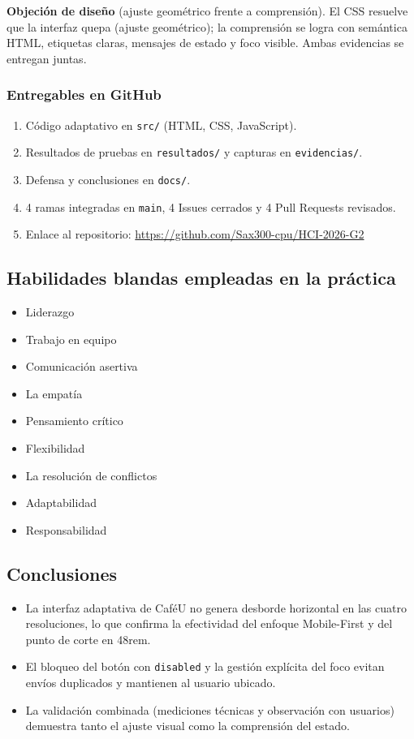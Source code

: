 \documentclass{article}
\begin{document}
\textbf{Objeción de diseño} (ajuste geométrico frente a comprensión). El CSS resuelve que la interfaz quepa (ajuste geométrico); la comprensión se logra con semántica HTML, etiquetas claras, mensajes de estado y foco visible. Ambas evidencias se entregan juntas.

\subsubsection{Entregables en GitHub}
\begin{enumerate}
    \item Código adaptativo en \texttt{src/} (HTML, CSS, JavaScript).
    \item Resultados de pruebas en \texttt{resultados/} y capturas en \texttt{evidencias/}.
    \item Defensa y conclusiones en \texttt{docs/}.
    \item 4 ramas integradas en \texttt{main}, 4 Issues cerrados y 4 Pull Requests revisados.
    \item Enlace al repositorio: \url{https://github.com/Sax300-cpu/HCI-2026-G2}
\end{enumerate}

\subsection{Habilidades blandas empleadas en la práctica}
\begin{itemize}
    \item[$\blacksquare$] Liderazgo
    \item[$\blacksquare$] Trabajo en equipo
    \item[$\square$] Comunicación asertiva
    \item[$\square$] La empatía
    \item[$\blacksquare$] Pensamiento crítico
    \item[$\square$] Flexibilidad
    \item[$\square$] La resolución de conflictos
    \item[$\square$] Adaptabilidad
    \item[$\blacksquare$] Responsabilidad
\end{itemize}

\subsection{Conclusiones}
\begin{itemize}
    \item La interfaz adaptativa de CaféU no genera desborde horizontal en las cuatro resoluciones, lo que confirma la efectividad del enfoque Mobile-First y del punto de corte en 48rem.
    \item El bloqueo del botón con \texttt{disabled} y la gestión explícita del foco evitan envíos duplicados y mantienen al usuario ubicado.
    \item La validación combinada (mediciones técnicas y observación con usuarios) demuestra tanto el ajuste visual como la comprensión del estado.
\end{itemize}
\end{document}
